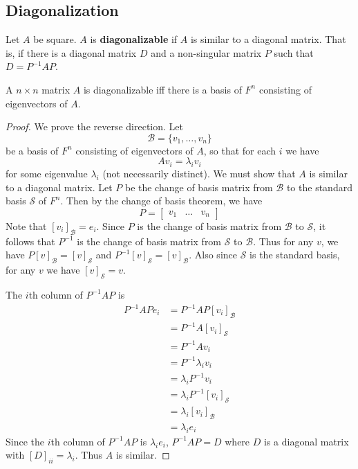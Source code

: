 \documentclass{article}
\begin{document}
    \subsection{Diagonalization}
    \begin{definition}
      Let $A$ be square. $A$ is \textbf{diagonalizable} if $A$ is similar to a diagonal matrix. That is, if there is a diagonal matrix $D$ and a non-singular matrix $P$ such that $D = P^{-1}AP$.
    \end{definition}
    \begin{theorem}
      A $n \times n$ matrix $A$ is diagonalizable iff there is a basis of $F^n$ consisting of eigenvectors of $A$.
    \end{theorem}
    \begin{proof}
      We prove the reverse direction. Let \[
        \mathcal{B} = \{v_1, \ldots, v_n\}
      \] be a basis of $F^n$ consisting of eigenvectors of $A$, so that for each $i$ we have \[
        Av_i = \lambda_iv_i
      \] for some eigenvalue $\lambda_i$ (not necessarily distinct). We must show that $A$ is similar to a diagonal matrix. Let $P$ be the change of basis matrix from $\mathcal{B}$ to the standard basis $\mathcal{S}$ of $F^n$. Then by the change of basis theorem, we have \[
        P =
        \begin{bmatrix}
          v_1 & \dots & v_n
        \end{bmatrix}
      \]
      Note that $[v_i]_{\mathcal{B}} = e_i$. Since $P$ is the change of basis matrix from $\mathcal{B}$ to $\mathcal{S}$, it follows that $P^{-1}$ is the change of basis matrix from $\mathcal{S}$ to $\mathcal{B}$. Thus for any $v$, we have $P[v]_\mathcal{B} = [v]_\mathcal{S}$ and $P^{-1}[v]_\mathcal{S} = [v]_\mathcal{B}$. Also since $\mathcal{S}$ is the standard basis, for any $v$ we have $[v]_\mathcal{S} = v$.

      The $i$th column of $P^{-1}AP$ is
      \begin{align*}
        P^{-1}APe_i &= P^{-1}AP[v_i]_\mathcal{B}\\
        &= P^{-1}A[v_i]_\mathcal{S}\\
        &= P^{-1}Av_i\\
        &= P^{-1}\lambda_i v_i\\
        &= \lambda_i P^{-1}v_i\\
        &= \lambda_i P^{-1}[v_i]_\mathcal{S}\\
        &= \lambda_i[v_i]_\mathcal{B}\\
        &= \lambda_i e_i
      \end{align*}
      Since the $i$th column of $P^{-1}AP$ is $\lambda_ie_i$, $P^{-1}AP = D$ where $D$ is a diagonal matrix with $[D]_{ii} = \lambda_i$. Thus $A$ is similar.


\end{proof}
\end{document}
